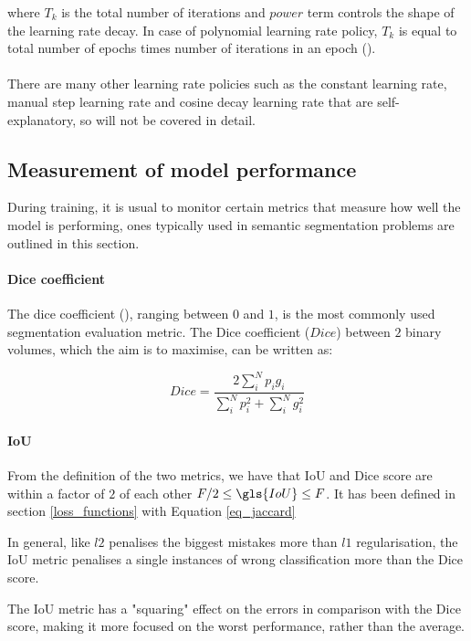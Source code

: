 where $T_{k}$ is the total number of iterations and $power$ term controls the shape of the learning rate decay. In case of polynomial learning rate policy, $T_{k}$ is equal to total number of epochs times number of iterations in an epoch (\cite{8929465}).

\paragraph{} 
There are many other learning rate policies such as the constant learning rate, manual step learning rate and cosine decay learning rate that are self-explanatory, so will not be covered in detail.


\subsection{Measurement of model performance} \label{performance_measures}
During training, it is usual to monitor certain metrics that measure how well the model is performing, ones typically used in semantic segmentation problems are outlined in this section.

\paragraph{Dice coefficient}
The dice coefficient (\cite{7785132}), ranging between $0$ and $1$, is the most commonly used segmentation evaluation metric. The Dice coefficient ($Dice$) between $2$ binary volumes, which the aim is to maximise, can be written as:

\begin{equation}
    \label{eq_dice_coef}
    Dice=\frac{2\sum_{{i}}^{N}p_{i}g_{i}}{\sum_{i}^{N}p_{i}^{2}+\sum_{i}^{N}g_{{i}}^{2}}
\end{equation}

\paragraph{\gls{IoU}}
From the definition of the two metrics, we have that \gls{IoU} and Dice score are within a factor of $2$ of each other $F/2 \leq \gls{IoU} \leq F$. It has been defined in section \ref{loss_functions} with Equation \ref{eq_jaccard}

In general, like $l2$ penalises the biggest mistakes more than $l1$ regularisation, the \gls{IoU} metric penalises a single instances of wrong classification more than the Dice score. 

The \gls{IoU} metric has a "squaring" effect on the errors in comparison with the Dice score, making it more focused on the worst performance, rather than the average.


